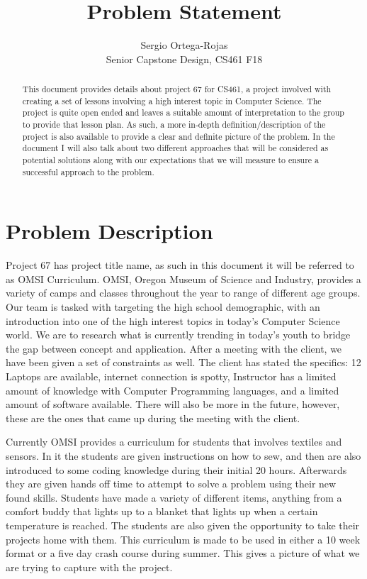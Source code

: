 \documentclass[10pt,a4paper,onecolumn,draftclsnofoot]{IEEEtran}
\author{Sergio Ortega-Rojas\\Senior Capstone Design, CS461 F18}
\title{Problem Statement}
\date{}
\begin{document}
\maketitle
\begin{abstract}
This document provides details about project 67 for CS461, a project involved with creating a set of lessons involving a high interest topic in Computer Science. The project is quite open ended and leaves a suitable amount of interpretation to the group to provide that lesson plan. As such, a more in-depth definition/description of the project is also available to provide a clear and definite picture of the problem. In the document I will also talk about two different approaches that will be considered as potential solutions along with our expectations that we will measure to ensure a successful approach to the problem.
\end{abstract}
\newpage
\section*{Problem Description}
Project 67 has project title name, as such in this document it will be referred to as OMSI Curriculum. OMSI, Oregon Museum of Science and Industry, provides a variety of camps and classes throughout the year to range of different age groups. Our team is tasked with targeting the high school demographic, with an introduction into one of the high interest topics in today's Computer Science world. We are to research what is currently trending in today's youth to bridge the gap between concept and application. After a meeting with the client, we have been given a set of constraints as well. The client has stated the specifics: 12 Laptops are available, internet connection is spotty, Instructor has a limited amount of knowledge with Computer Programming languages, and a limited amount of software available. There will also be more in the future, however, these are the ones that came up during the meeting with the client.

Currently OMSI provides a curriculum for students that involves textiles and sensors. In it the students are given instructions on how to sew, and then are also introduced to some coding knowledge during their initial 20 hours. Afterwards they are given hands off time to attempt to solve a problem using their new found skills. Students have made a variety of different items, anything from a comfort buddy that lights up to a blanket that lights up when a certain temperature is reached. The students are also given the opportunity to take their projects home with them. This curriculum is made to be used in either a 10 week format or a five day crash course during summer. This gives a picture of what we are trying to capture with the project.
\end{document}
